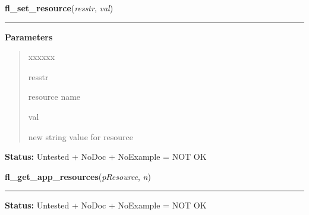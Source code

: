     \vspace{0.5ex}

\hspace{.8\funcindent}\begin{boxedminipage}{\funcwidth}

    \raggedright \textbf{fl\_set\_resource}(\textit{resstr}, \textit{val})

    \vspace{-1.5ex}

    \rule{\textwidth}{0.5\fboxrule}
\setlength{\parskip}{2ex}
\setlength{\parskip}{1ex}
      \textbf{Parameters}
      \vspace{-1ex}

      \begin{quote}
        \begin{Ventry}{xxxxxx}

          \item[resstr]

          resource name

          \item[val]

          new string value for resource

        \end{Ventry}

      \end{quote}

\textbf{Status:} Untested + NoDoc + NoExample = NOT OK



    \end{boxedminipage}

    \label{xformslib:library:fl_get_app_resources}

    \vspace{0.5ex}

\hspace{.8\funcindent}\begin{boxedminipage}{\funcwidth}

    \raggedright \textbf{fl\_get\_app\_resources}(\textit{pResource}, \textit{n})

    \vspace{-1.5ex}

    \rule{\textwidth}{0.5\fboxrule}
\setlength{\parskip}{2ex}
\setlength{\parskip}{1ex}
\textbf{Status:} Untested + NoDoc + NoExample = NOT OK



    \end{boxedminipage}

